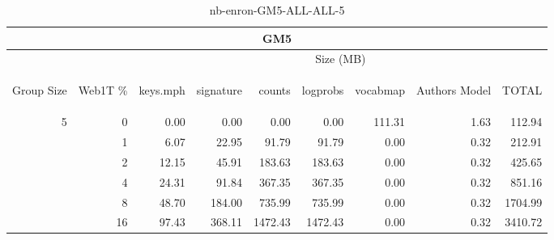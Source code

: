 \begin{center}
\begin{table}[htbp]
\begin{tabular}{ | r | r | r | r | r | r | r | r | r |}
\hline
\multicolumn{9}{|c|}{GM5}\\
\hline
 & & \multicolumn{7}{|c|}{Size (MB)}\\ \cline{3-9}
\begin{sideways}Group Size\end{sideways} & \begin{sideways}Web1T \% \end{sideways} & \begin{sideways}keys.mph\end{sideways} & \begin{sideways}signature\end{sideways} & \begin{sideways}counts\end{sideways} & \begin{sideways}logprobs\end{sideways} & \begin{sideways}vocabmap\end{sideways} & \begin{sideways}Authors Model \end{sideways} & \begin{sideways}TOTAL\end{sideways}\\
\hline
\multirow{5}{*}{5}
 & 0 & 0.00 & 0.00 & 0.00 & 0.00 & 111.31 & 1.63 & 112.94\\ \cline{2-9}
 & 1 & 6.07 & 22.95 & 91.79 & 91.79 & 0.00 & 0.32 & 212.91\\ \cline{2-9}
 & 2 & 12.15 & 45.91 & 183.63 & 183.63 & 0.00 & 0.32 & 425.65\\ \cline{2-9}
 & 4 & 24.31 & 91.84 & 367.35 & 367.35 & 0.00 & 0.32 & 851.16\\ \cline{2-9}
 & 8 & 48.70 & 184.00 & 735.99 & 735.99 & 0.00 & 0.32 & 1704.99\\ \cline{2-9}
 & 16 & 97.43 & 368.11 & 1472.43 & 1472.43 & 0.00 & 0.32 & 3410.72\\ \cline{2-9}
\hline
\end{tabular}
\caption{nb-enron-GM5-ALL-ALL-5}
\label{table:nb-enron-GM5-ALL-ALL-5}
\end{table}
\end{center}

